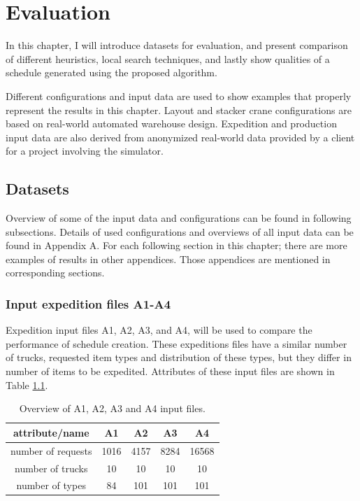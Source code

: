 \documentclass{ctuthesis}
\begin{document}
\chapter{Evaluation}
\label{ch:Evaluation}

In this chapter, I will introduce datasets for evaluation, and present comparison of different heuristics, local search techniques, and lastly show qualities of a schedule generated using the proposed algorithm.

Different configurations and input data are used to show examples that properly represent the results in this chapter. Layout and stacker crane configurations are based on real-world automated warehouse design. Expedition and production input data are also derived from anonymized real-world data provided by a client for a project involving the simulator.

\section{Datasets}
Overview of some of the input data and configurations can be found in following subsections. Details of used configurations and overviews of all input data can be found in Appendix A. For each following section in this chapter; there are more examples of results in other appendices. Those appendices are mentioned in corresponding sections.


\subsection{Input expedition files A1-A4}
\label{subsec:dataA}

Expedition input files A1, A2, A3, and A4, will be used to compare the performance of schedule creation. These expeditions files have a similar number of trucks, requested item types and distribution of these types, but they differ in number of items to be expedited. Attributes of these input files are shown in Table \ref{tab:in1}.

\begin{table}[H]
\begin{tabular}{ |c| c c c c|} 
\hline
attribute/name & A1 & A2 & A3 & A4\\ 
\hline
number of requests & 1016 & 4157 & 8284 & 16568 \\
\hline
number of trucks & 10 & 10 & 10 & 10 \\ 
\hline
number of types & 84 & 101 & 101 & 101 \\ 
\hline
\end{tabular}
\caption{Overview of A1, A2, A3 and A4 input files.} \label{tab:in1}
\end{table}
\end{document}

